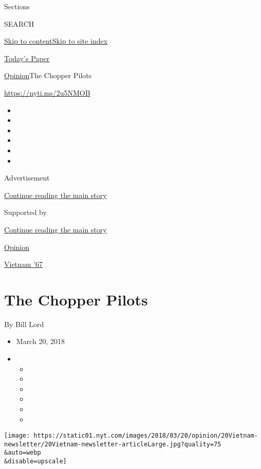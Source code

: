 Sections

SEARCH

\protect\hyperlink{site-content}{Skip to
content}\protect\hyperlink{site-index}{Skip to site index}

\href{https://myaccount.nytimes.com/auth/login?response_type=cookie\&client_id=vi}{}

\href{https://www.nytimes.com/section/todayspaper}{Today's Paper}

\href{/section/opinion}{Opinion}\textbar{}The Chopper Pilots

\href{https://nyti.ms/2u5NMOB}{https://nyti.ms/2u5NMOB}

\begin{itemize}
\item
\item
\item
\item
\item
\item
\end{itemize}

Advertisement

\protect\hyperlink{after-top}{Continue reading the main story}

Supported by

\protect\hyperlink{after-sponsor}{Continue reading the main story}

\href{/section/opinion}{Opinion}

\href{/column/vietnam-67}{Vietnam '67}

\hypertarget{the-chopper-pilots}{%
\section{The Chopper Pilots}\label{the-chopper-pilots}}

By Bill Lord

\begin{itemize}
\item
  March 20, 2018
\item
  \begin{itemize}
  \item
  \item
  \item
  \item
  \item
  \item
  \end{itemize}
\end{itemize}

\texttt{[image: https://static01.nyt.com/images/2018/03/20/opinion/20Vietnam-newsletter/20Vietnam-newsletter-articleLarge.jpg?quality=75\\\&auto=webp\\\&disable=upscale]}

